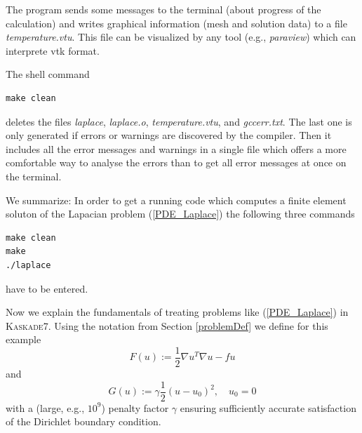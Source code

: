 \documentclass[11pt]{article}
\begin{document}
\noindent The program sends some messages to the terminal (about progress of the calculation)
and writes graphical information (mesh and solution data) 
to a file {\em temperature.vtu}. This file can be visualized by any tool (e.g., {\em paraview})
which can interprete vtk format.

The shell command

\begin{scriptsize}
\begin{verbatim}
make clean
\end{verbatim}
\end{scriptsize}

\noindent deletes the files {\em laplace}, {\em laplace.o}, {\em temperature.vtu}, and {\em gccerr.txt}.
The last one is only generated if errors or warnings are discovered by the compiler. Then it includes all the
error messages and warnings in a single file which offers a more comfortable way to analyse the errors than to get all error messages at once on the terminal.

We summarize:
In order to get a running code which computes a finite element soluton of the Lapacian problem
(\ref{PDE_Laplace}) the following three commands

\begin{scriptsize}
\begin{verbatim}
make clean
make 
./laplace
\end{verbatim}
\end{scriptsize}

\noindent have to be entered.

Now we explain the fundamentals of treating problems like (\ref{PDE_Laplace}) in \textsc{Kaskade7}.
Using the notation from Section \ref{problemDef} we define for this example
\[
F(u) := \frac{1}{2}\nabla u^T \nabla u  -  f u
\]
and 
\[
G(u) := \gamma\frac{1}{2} (u-u_0)^2, \quad u_0 = 0
\]
with a (large, e.g., $10^9$) penalty factor $\gamma$ ensuring sufficiently accurate satisfaction of the Dirichlet boundary condition.
\end{document}
